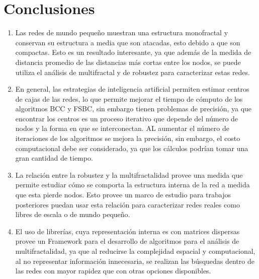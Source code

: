 \section{Conclusiones}

\begin{enumerate}
    \item Las redes de mundo pequeño muestran una estructura monofractal y conservan su estructura a media que son atacadas, esto debido a que son compactas. Esto es un resultado interesante, ya que además de la medida de distancia promedio de las distancias más cortas entre los nodos, se puede utiliza el análisis de multifractal y de robustez para caracterizar estas redes.
    \item En general, las estrategias de inteligencia artificial permiten estimar centros de cajas de las redes, lo que permite mejorar el tiempo de cómputo de los algoritmos BCC y FSBC, sin embargo tienen problemas de precisión, ya que encontrar los centros es un proceso iterativo que depende del número de nodos y la forma en que se interconectan. AL aumentar el número de iteraciones de los algoritmos se mejora la precisión, sin embargo, el costo computacional debe ser considerado, ya que los cálculos podrían tomar una gran cantidad de tiempo.
    \item La relación entre la robustez y la multifractalidad provee una medida que permite estudiar cómo se comporta la estructura interna de la red a medida que esta pierde nodos. Esto provee un marco de estudio para trabajos posteriores puedan usar esta relación para caracterizar redes reales como libres de escala o de mundo pequeño. 
    \item El uso de librerías, cuya representación interna es con matrices dispersas provee un Framework para el desarrollo de algoritmos para el análisis de multifractalidad, ya que al reducirse la complejidad espacial y computacional, al no representar información innecesaria, se realizan las búsquedas dentro de las redes con mayor rapidez que con otras opciones disponibles.
\end{enumerate}